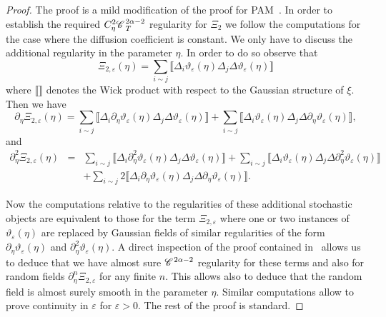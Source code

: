 \documentclass{amsart}
\theoremstyle{remark}
\theoremstyle{definition}
\newcommand{\CC}{\mathscr{C} \hspace{.1em}}
\begin{document}
\begin{proof}
  The proof is a mild modification of the proof for
  PAM~{\cite{gubinelli_paracontrolled_2015}}. In order to establish the
  required $C^2_{\eta} \CC^{2 \alpha - 2}_T$ regularity for $\Xi_2$ we follow
  the computations for the case where the diffusion coefficient is constant.
  We only have to discuss the additional regularity in the parameter $\eta$.
  In order to do so observe that
  \[ \Xi_{2, \varepsilon} (\eta) = \sum_{i \sim j} \llbracket \Delta_i
     \vartheta_{\varepsilon} (\eta) \Delta_j \Delta \vartheta_{\varepsilon}
     (\eta) \rrbracket \]
  where $\llbracket \rrbracket$ denotes the Wick product with respect to the
  Gaussian structure of $\xi$. Then we have
  \[ \partial_{\eta} \Xi_{2, \varepsilon} (\eta) = \sum_{i \sim j} \llbracket
     \Delta_i \partial_{\eta} \vartheta_{\varepsilon} (\eta) \Delta_j \Delta
     \vartheta_{\varepsilon} (\eta) \rrbracket + \sum_{i \sim j} \llbracket
     \Delta_i \vartheta_{\varepsilon} (\eta) \Delta_j \Delta \partial_{\eta}
     \vartheta_{\varepsilon} (\eta) \rrbracket, \]
  and
  \begin{eqnarray*}
    \partial_{\eta}^2 \Xi_{2, \varepsilon} (\eta) & = & \sum_{i \sim j}
    \llbracket \Delta_i \partial_{\eta}^2 \vartheta_{\varepsilon} (\eta)
    \Delta_j \Delta \vartheta_{\varepsilon} (\eta) \rrbracket + \sum_{i \sim
    j} \llbracket \Delta_i \vartheta_{\varepsilon} (\eta) \Delta_j \Delta
    \partial_{\eta}^2 \vartheta_{\varepsilon} (\eta) \rrbracket\\
    &  & + \sum_{i \sim j} 2 \llbracket \Delta_i \partial_{\eta}
    \vartheta_{\varepsilon} (\eta) \Delta_j \Delta \partial_{\eta}
    \vartheta_{\varepsilon} (\eta) \rrbracket .
  \end{eqnarray*}
  
  
  Now the computations relative to the regularities of these additional
  stochastic objects are equivalent to those for the term $\Xi_{2,
  \varepsilon}$ where one or two instances of $\vartheta_{\varepsilon} (\eta)$
  are replaced by Gaussian fields of similar regularities of the form
  $\partial_{\eta} \vartheta_{\varepsilon} (\eta)$ and $\partial_{\eta}^2
  \vartheta_{\varepsilon} (\eta)$. A direct inspection of the proof contained
  in~{\cite{gubinelli_paracontrolled_2015}} allows us to deduce that we have
  almost sure $\CC^{2 \alpha - 2}$ regularity for these terms and also for
  random fields $\partial_{\eta}^n \Xi_{2, \varepsilon}$ for any finite $n$.
  This allows also to deduce that the random field is almost surely smooth in
  the parameter $\eta$. Similar computations allow to prove continuity in
  $\varepsilon$ for $\varepsilon > 0$. The rest of the proof is standard.
\end{proof}
\end{document}
